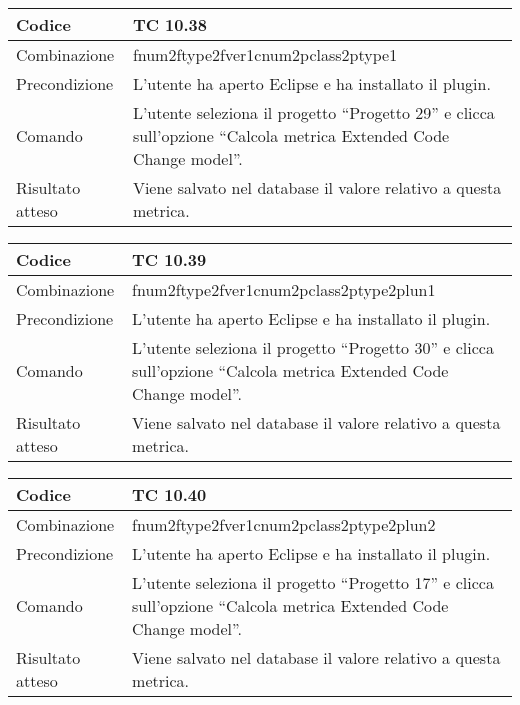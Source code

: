 \begin{table}[ht]
\begin{tabular}{|p{3cm}|p{9cm}|}
\hline
\cellcolor{lightgray}Codice				& TC 10.38								\\
\hline
\cellcolor{lightgray}Combinazione		& fnum2ftype2fver1cnum2pclass2ptype1									\\
\hline
\cellcolor{lightgray}Precondizione		& L'utente ha aperto Eclipse e ha installato il plugin.		\\
\hline
\cellcolor{lightgray}Comando			& L'utente seleziona il progetto ``Progetto 29''  e clicca sull'opzione ``Calcola metrica Extended Code Change model''.	\\
\hline
\cellcolor{lightgray}Risultato atteso	& Viene salvato nel database il valore relativo a questa metrica.\\
\hline
\end{tabular}
\end{table}

\begin{table}[ht]
\begin{tabular}{|p{3cm}|p{9cm}|}
\hline
\cellcolor{lightgray}Codice				& TC 10.39								\\
\hline
\cellcolor{lightgray}Combinazione		& fnum2ftype2fver1cnum2pclass2ptype2plun1									\\
\hline
\cellcolor{lightgray}Precondizione		& L'utente ha aperto Eclipse e ha installato il plugin.		\\
\hline
\cellcolor{lightgray}Comando			& L'utente seleziona il progetto ``Progetto 30''  e clicca sull'opzione ``Calcola metrica Extended Code Change model''.	\\
\hline
\cellcolor{lightgray}Risultato atteso	& Viene salvato nel database il valore relativo a questa metrica.\\
\hline
\end{tabular}
\end{table}

\begin{table}[ht]
\begin{tabular}{|p{3cm}|p{9cm}|}
\hline
\cellcolor{lightgray}Codice				& TC 10.40								\\
\hline
\cellcolor{lightgray}Combinazione		& fnum2ftype2fver1cnum2pclass2ptype2plun2									\\
\hline
\cellcolor{lightgray}Precondizione		& L'utente ha aperto Eclipse e ha installato il plugin.		\\
\hline
\cellcolor{lightgray}Comando			& L'utente seleziona il progetto ``Progetto 17''  e clicca sull'opzione ``Calcola metrica Extended Code Change model''.	\\
\hline
\cellcolor{lightgray}Risultato atteso	& Viene salvato nel database il valore relativo a questa metrica.\\
\hline
\end{tabular}
\end{table}

